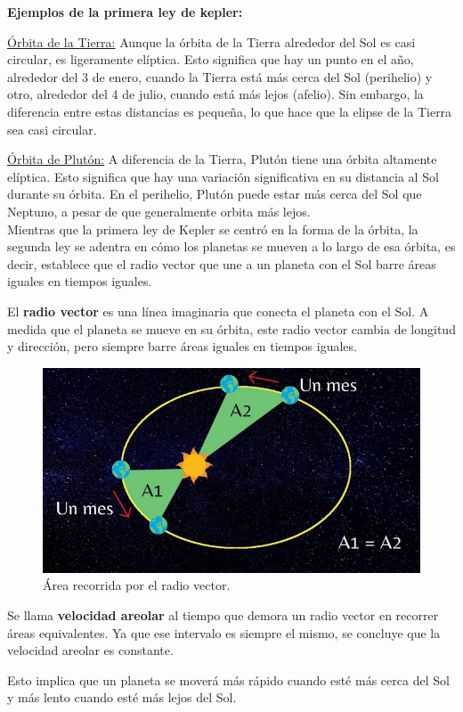 \documentclass{article}
\begin{document}
	
	\textbf{Ejemplos de la primera ley de kepler:}
	
	\underline{Órbita de la Tierra:} Aunque la órbita de la Tierra alrededor del Sol es casi circular, es ligeramente elíptica. Esto significa que hay un punto en el año, alrededor del 3 de enero, cuando la Tierra está más cerca del Sol (perihelio) y otro, alrededor del 4 de julio, cuando está más lejos (afelio). Sin embargo, la diferencia entre estas distancias es pequeña, lo que hace que la elipse de la Tierra sea casi circular.
	
	\underline{Órbita de Plutón:} A diferencia de la Tierra, Plutón tiene una órbita altamente elíptica. Esto significa que hay una variación significativa en su distancia al Sol durante su órbita. En el perihelio, Plutón puede estar más cerca del Sol que Neptuno, a pesar de que generalmente orbita más lejos.\\
	
	Mientras que la primera ley de Kepler se centró en la forma de la órbita, la segunda ley se adentra en cómo los planetas se mueven a lo largo de esa órbita, es decir, establece que el radio vector que une a un planeta con el Sol barre áreas iguales en tiempos iguales.
	
	El \textbf{radio vector} es una línea imaginaria que conecta el planeta con el Sol. A medida que el planeta se mueve en su órbita, este radio vector cambia de longitud y dirección, pero siempre barre áreas iguales en tiempos iguales.
	
	\begin{figure}[H]
		\centering
		\includegraphics[width=0.6\linewidth]{radio_vector}
		\caption{Área recorrida por el radio vector.}
		\label{fig:radiovector}
	\end{figure}
	
	Se llama \textbf{velocidad areolar} al tiempo que demora un radio vector en recorrer áreas equivalentes. Ya que ese intervalo es siempre el mismo, se concluye que la velocidad areolar es constante.
	
	Esto implica que un planeta se moverá más rápido cuando esté más cerca del Sol y más lento cuando esté más lejos del Sol.
	
\end{document}
